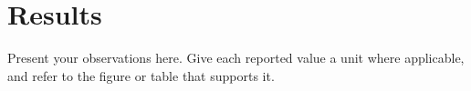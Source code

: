 \section{Results}

Present your observations here. Give each reported value a unit where applicable,
and refer to the figure or table that supports it.
